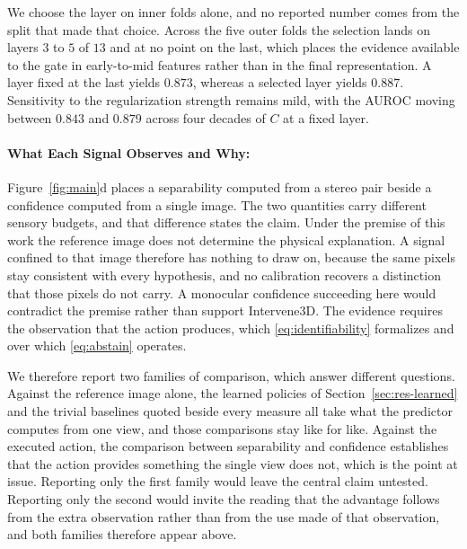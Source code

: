 \documentclass{article} %
\theoremstyle{defstyle}
\theoremstyle{plain}
\begin{document}
We choose the layer on inner folds alone, and no reported number comes from the split that
made that choice. Across the five outer folds the selection lands on layers $3$ to $5$ of
$13$ and at no point on the last, which places the evidence available to the gate in
early-to-mid features rather than in the final representation. A layer fixed at the last
yields $0.873$, whereas a selected layer yields $0.887$. Sensitivity to the regularization
strength remains mild, with the AUROC moving between $0.843$ and $0.879$ across four decades
of $C$ at a fixed layer.

\paragraph{What Each Signal Observes and Why:}
Figure~\ref{fig:main}d places a separability computed from a stereo pair beside a confidence
computed from a single image. The two quantities carry different sensory budgets, and that
difference states the claim. Under the premise of this work the reference image does not
determine the physical explanation. A signal confined to that image therefore has nothing to
draw on, because the same pixels stay consistent with every hypothesis, and no calibration
recovers a distinction that those pixels do not carry. A monocular confidence succeeding here
would contradict the premise rather than support Intervene3D. The evidence requires the
observation that the action produces, which \eqref{eq:identifiability} formalizes and over
which \eqref{eq:abstain} operates.

We therefore report two families of comparison, which answer different questions. Against the
reference image alone, the learned policies of Section~\ref{sec:res-learned} and the trivial
baselines quoted beside every measure all take what the predictor computes from one view, and
those comparisons stay like for like. Against the executed action, the comparison between
separability and confidence establishes that the action provides something the single view does
not, which is the point at issue. Reporting only the first family would leave the central claim
untested. Reporting only the second would invite the reading that the advantage follows from
the extra observation rather than from the use made of that observation, and both families
therefore appear above.
\end{document}
